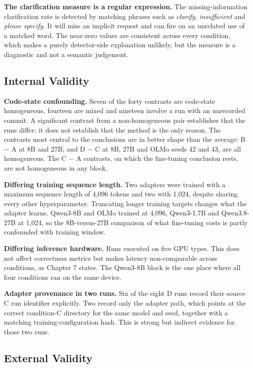 \textbf{The clarification measure is a regular expression.} The missing-information clarification rate is detected by matching phrases such as \emph{clarify}, \emph{insufficient} and \emph{please specify}. It will miss an implicit request and can fire on an unrelated use of a matched word. The near-zero values are consistent across every condition, which makes a purely detector-side explanation unlikely, but the measure is a diagnostic and not a semantic judgement.

\subsection{Internal Validity}

\textbf{Code-state confounding.} Seven of the forty contrasts are code-state homogeneous, fourteen are mixed and nineteen involve a run with an unrecorded commit. A significant contrast from a non-homogeneous pair establishes that the runs differ; it does not establish that the method is the only reason. The contrasts most central to the conclusions are in better shape than the average: B \ensuremath{-} A at 8B and 27B, and D \ensuremath{-} C at 8B, 27B and OLMo seeds 42 and 43, are all homogeneous. The C \ensuremath{-} A contrasts, on which the fine-tuning conclusion rests, are not homogeneous in any block.

\textbf{Differing training sequence length.} Two adapters were trained with a maximum sequence length of 4,096 tokens and two with 1,024, despite sharing every other hyperparameter. Truncating longer training targets changes what the adapter learns. Qwen3-8B and OLMo trained at 4,096, Qwen3-1.7B and Qwen3.8-27B at 1,024, so the 8B-versus-27B comparison of what fine-tuning costs is partly confounded with training window.

\textbf{Differing inference hardware.} Runs executed on five GPU types. This does not affect correctness metrics but makes latency non-comparable across conditions, as Chapter 7 states. The Qwen3-8B block is the one place where all four conditions ran on the same device.

\textbf{Adapter provenance in two runs.} Six of the eight D runs record their source C run identifier explicitly. Two record only the adapter path, which points at the correct condition-C directory for the same model and seed, together with a matching training-configuration hash. This is strong but indirect evidence for those two runs.

\subsection{External Validity}

